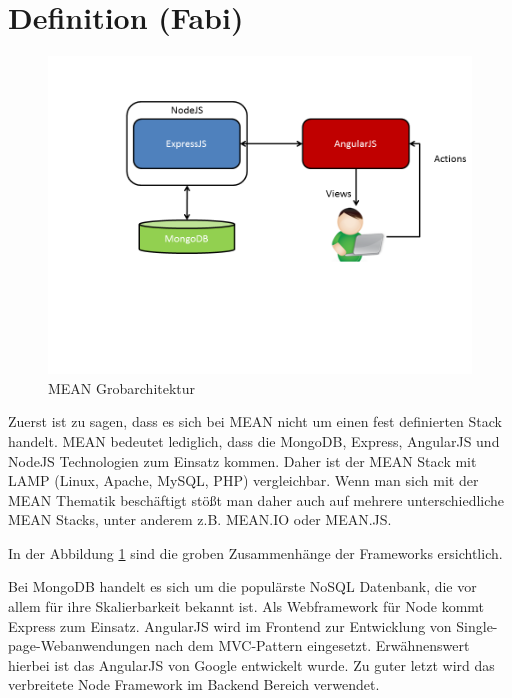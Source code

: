 \section{Definition (Fabi)}
\label{definition-fabi}

\begin{figure}[h]
	\centering
	\includegraphics[width=0.7\linewidth]{figures/mean-grobarchitektur.png}
	\caption{MEAN Grobarchitektur}
	\label{f:mean-grobarchitektur}
\end{figure}

Zuerst ist zu sagen, dass es sich bei MEAN nicht um einen fest definierten Stack handelt. MEAN bedeutet lediglich, dass die MongoDB, Express, AngularJS und NodeJS Technologien zum Einsatz kommen. Daher ist der MEAN Stack mit LAMP (Linux, Apache, MySQL, PHP) vergleichbar. Wenn man sich mit der MEAN Thematik beschäftigt stößt man daher auch auf mehrere unterschiedliche MEAN Stacks, unter anderem z.B. MEAN.IO oder MEAN.JS.

In der Abbildung \ref{f:mean-grobarchitektur} sind die groben Zusammenhänge der Frameworks ersichtlich.

Bei MongoDB handelt es sich um die populärste NoSQL Datenbank, die vor allem für ihre Skalierbarkeit bekannt ist. Als Webframework für Node kommt Express zum Einsatz. AngularJS wird im Frontend zur Entwicklung von Single-page-Webanwendungen nach dem MVC-Pattern eingesetzt. Erwähnenswert hierbei ist das AngularJS von Google entwickelt wurde. Zu guter letzt wird das verbreitete Node Framework im Backend Bereich verwendet.